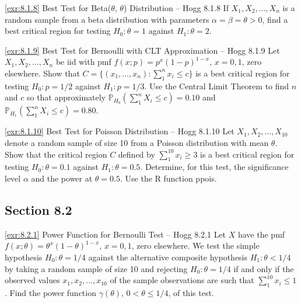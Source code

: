 \begin{exercise}{\ref{exr:8.1.8} Best Test for Beta($\theta$, $\theta$) Distribution -- Hogg 8.1.8}\label{exr:8.1.8}
If $X_1, X_2, \ldots, X_n$ is a random sample from a beta distribution with parameters $\alpha = \beta = \theta > 0$, find a best critical region for testing $H_0: \theta = 1$ against $H_1: \theta = 2$.
\end{exercise}

\begin{exercise}{\ref{exr:8.1.9} Best Test for Bernoulli with CLT Approximation -- Hogg 8.1.9}\label{exr:8.1.9}
Let $X_1, X_2, \ldots, X_n$ be iid with pmf $f(x; p) = p^x(1-p)^{1-x}$, $x = 0, 1$, zero elsewhere. Show that $C = \{(x_1, \ldots, x_n): \sum_{1}^n x_i \leq c\}$ is a best critical region for testing $H_0: p = 1/2$ against $H_1: p = 1/3$. Use the Central Limit Theorem to find $n$ and $c$ so that approximately $\mathbb{P}_{H_0}(\sum_{1}^n X_i \leq c) = 0.10$ and $\mathbb{P}_{H_1}(\sum_{1}^n X_i \leq c) = 0.80$.
\end{exercise}

\begin{exercise}{\ref{exr:8.1.10} Best Test for Poisson Distribution -- Hogg 8.1.10}\label{exr:8.1.10}
Let $X_1, X_2, \ldots, X_{10}$ denote a random sample of size 10 from a Poisson distribution with mean $\theta$. Show that the critical region $C$ defined by $\sum_{1}^{10} x_i \geq 3$ is a best critical region for testing $H_0: \theta = 0.1$ against $H_1: \theta = 0.5$. Determine, for this test, the significance level $\alpha$ and the power at $\theta = 0.5$. Use the R function ppois.
\end{exercise}

\subsection*{Section 8.2}

\begin{exercise}{\ref{exr:8.2.1} Power Function for Bernoulli Test -- Hogg 8.2.1}\label{exr:8.2.1}
Let $X$ have the pmf $f(x; \theta) = \theta^x(1-\theta)^{1-x}$, $x = 0, 1$, zero elsewhere. We test the simple hypothesis $H_0: \theta = 1/4$ against the alternative composite hypothesis $H_1: \theta < 1/4$ by taking a random sample of size 10 and rejecting $H_0: \theta = 1/4$ if and only if the observed values $x_1, x_2, \ldots, x_{10}$ of the sample observations are such that $\sum_{1}^{10} x_i \leq 1$. Find the power function $\gamma(\theta)$, $0 < \theta \leq 1/4$, of this test.
\end{exercise}

